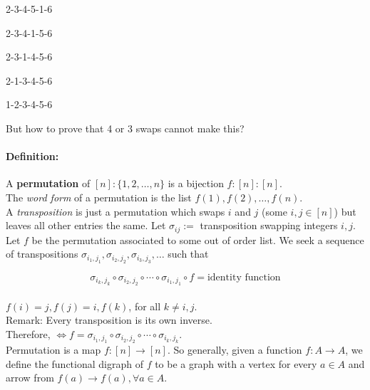 \documentclass[a4paper, 11pt, twoside]{article}
\begin{document}
2-3-4-5-1-6

2-3-4-1-5-6

2-3-1-4-5-6

2-1-3-4-5-6

1-2-3-4-5-6

But how to prove that 4 or 3 swaps cannot make this?

\paragraph{Definition:} A \textbf{permutation} of $[n]:\{1, 2, \dots, n\}$ is a bijection $f:[n]:[n]$.\\

The \textit{word form} of a permutation is the list $f(1), f(2), \dots, f(n)$.\\

A \textit{transposition} is just a permutation which swaps $i$ and $j$ (some $i, j \in [n]$) but leaves all other entries the same. Let $\sigma_{ij}:=$ transposition swapping integers $i,j$.\\

Let $f$ be the permutation associated to some out of order list. We seek a sequence of transpositions $\sigma_{i_1,j_1}, \sigma_{i_2,j_2}, \sigma_{i_3,j_3},\dots$ such that

\[\sigma_{i_k,j_k}\circ \sigma_{i_2, j_2} \circ\cdots\circ \sigma_{i_1, j_1}\circ f = \text{identity function}\]\\

$f(i)=j, f(j)=i, f(k)$, for all $k\not=i,j$.\\

Remark: Every transposition is its own inverse.\\

Therefore, $\iff f=\sigma_{i_1, j_1}\circ \sigma_{i_2,j_2}\circ\cdots\circ \sigma_{i_k,j_k}$.\\

Permutation is a map $f:[n]\rightarrow [n]$. So generally, given a function $f:A\rightarrow A$, we define the functional digraph of $f$ to be a graph with a vertex for every $a\in A$ and arrow from $f(a)\rightarrow f(a), \forall a\in A.$\\
\end{document}
